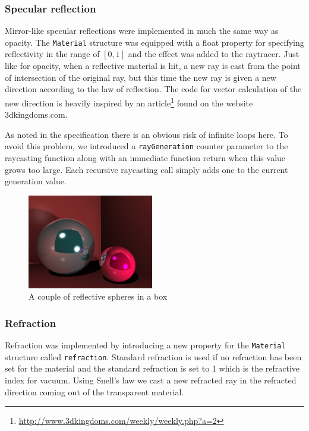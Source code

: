 \documentclass[a4paper,11pt]{article}
\begin{document}
\subsubsection{Specular reflection}
Mirror-like specular reflections were implemented in much the same way as opacity. The
\texttt{Material} structure was equipped with a float property for specifying reflectivity in the
range of $[0,1]$ and the effect was added to the raytracer. Just like for opacity, when a
reflective material is hit, a new ray is cast from the point of intersection of the original
ray, but this time the new ray is given a new direction according to the law of reflection.
The code for vector calculation of the new direction is heavily inspired by an
article\footnote{\url{http://www.3dkingdoms.com/weekly/weekly.php?a=2}} found on the website
3dkingdoms.com.

As noted in the specification there is an obvious risk of infinite loops here. To avoid
this problem, we introduced a \texttt{rayGeneration} counter parameter to the raycasting function
along with an immediate function return when this value grows too large. Each recursive
raycasting call simply adds one to the current generation value.

\begin{figure}[H]
\begin{center}
\includegraphics[width=5.5cm]{reflect.png}
\caption{A couple of reflective spheres in a box}
\end{center}
\end{figure}
\vspace{-0.5cm}

\subsubsection{Refraction}
Refraction was implemented by introducing a new property for the \texttt{Material} structure called \texttt{refraction}.
Standard refraction is used if no refraction has been set for the material and the standard 
refraction is set to 1 which is the refractive index for vacuum. 
Using Snell's law we cast a new refracted ray in the refracted direction coming out of the transparent material.
\end{document}
